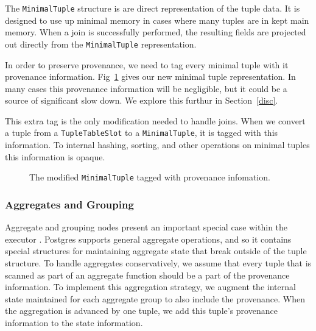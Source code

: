 The \texttt{MinimalTuple} structure is are direct representation of the tuple data. It is designed to use up minimal memory in cases where many tuples are in kept main memory. When a join is successfully performed, the resulting fields are projected out directly from the \texttt{MinimalTuple} representation. 

In order to preserve provenance, we need to tag every minimal tuple with it provenance information. Fig~\ref{mintup} gives our new minimal tuple representation. In many cases this provenance information will be negligible, but it could be a source of significant slow down. We explore this furthur in Section~\ref{disc}.

This extra tag is the only modification needed to handle joins. When we convert a tuple from a \texttt{TupleTableSlot} to a \texttt{MinimalTuple}, it is tagged with this information. To internal hashing, sorting, and other operations on minimal tuples this information is opaque.   

\begin{figure}
  \centering
  \label{mintup}
  \caption {The modified \texttt{MinimalTuple} tagged with provenance infomation.}
\end{figure}





\subsubsection{Aggregates and Grouping}

Aggregate and grouping nodes present an important special case within the executor . Postgres supports general aggregate operations, and so it contains special structures for maintaining aggregate state that break outside of the tuple structure. To handle aggregates conservatively, we assume that every tuple that is scanned as part of an aggregate function should be a part of the provenance information. To implement this aggregation strategy, we augment the internal state maintained for each aggregate group to also include the provenance. When the aggregation is advanced by one tuple, we add this tuple's provenance information to the state information. 


